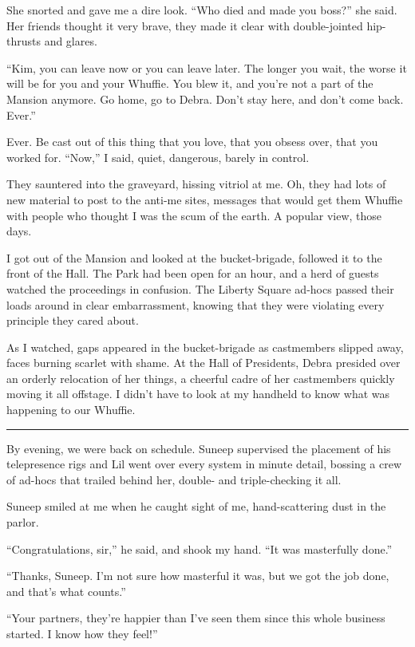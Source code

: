 She snorted and gave me a dire look. “Who died and made you boss?”
she said. Her friends thought it very brave, they made it clear
with double-jointed hip-thrusts and glares.

“Kim, you can leave now or you can leave later. The longer you
wait, the worse it will be for you and your Whuffie. You blew it,
and you're not a part of the Mansion anymore. Go home, go to Debra.
Don't stay here, and don't come back. Ever.”

Ever. Be cast out of this thing that you love, that you obsess
over, that you worked for. “Now,” I said, quiet, dangerous, barely
in control.

They sauntered into the graveyard, hissing vitriol at me. Oh, they
had lots of new material to post to the anti-me sites, messages
that would get them Whuffie with people who thought I was the scum
of the earth. A popular view, those days.

I got out of the Mansion and looked at the bucket-brigade, followed
it to the front of the Hall. The Park had been open for an hour,
and a herd of guests watched the proceedings in confusion. The
Liberty Square ad-hocs passed their loads around in clear
embarrassment, knowing that they were violating every principle
they cared about.

As I watched, gaps appeared in the bucket-brigade as castmembers
slipped away, faces burning scarlet with shame. At the Hall of
Presidents, Debra presided over an orderly relocation of her
things, a cheerful cadre of her castmembers quickly moving it all
offstage. I didn't have to look at my handheld to know what was
happening to our Whuffie.

\begin{center}\rule{3in}{0.4pt}\end{center}

By evening, we were back on schedule. Suneep supervised the
placement of his telepresence rigs and Lil went over every system
in minute detail, bossing a crew of ad-hocs that trailed behind
her, double- and triple-checking it all.

Suneep smiled at me when he caught sight of me, hand-scattering
dust in the parlor.

“Congratulations, sir,” he said, and shook my hand. “It was
masterfully done.”

“Thanks, Suneep. I'm not sure how masterful it was, but we got the
job done, and that's what counts.”

“Your partners, they're happier than I've seen them since this
whole business started. I know how they feel!”


